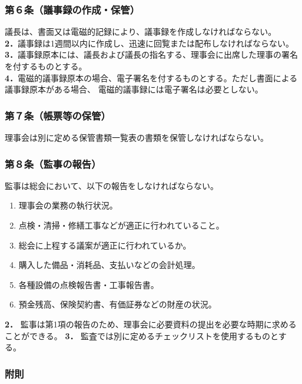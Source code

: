 \documentclass[12pt,uplatex]{jsarticle}
\begin{document}
\subsubsection*{ 第６条（議事録の作成・保管）}
議長は、書面又は電磁的記録により、議事録を作成しなければならない。\\
\textbf{2．}議事録は1週間以内に作成し、迅速に回覧または配布しなければならない。\\
\textbf{3．}議事録原本には、議長および議長の指名する、理事会に出席した理事の署名を付するものとする。\\
\textbf{4．}電磁的議事録原本の場合、電子署名を付するものとする。ただし書面による議事録原本がある場合、
電磁的議事録には電子署名は必要としない。\\
\subsubsection*{ 第７条（帳票等の保管）}
理事会は別に定める保管書類一覧表の書類を保管しなければならない。\\
\subsubsection*{ 第８条（監事の報告）}
監事は総会において、以下の報告をしなければならない。
\begin{enumerate}
  \item 理事会の業務の執行状況。
  \item 点検・清掃・修繕工事などが適正に行われていること。
  \item 総会に上程する議案が適正に行われているか。
  \item 購入した備品・消耗品、支払いなどの会計処理。
  \item 各種設備の点検報告書・工事報告書。
  \item 預金残高、保険契約書、有価証券などの財産の状況。
\end{enumerate}
\textbf{2．} 監事は第1項の報告のため、理事会に必要資料の提出を必要な時期に求めることができる。
\textbf{3．} 監査では別に定めるチェックリストを使用するものとする。

\begin{center}
\subsubsection*{附則}
\end{center}
\end{document}
